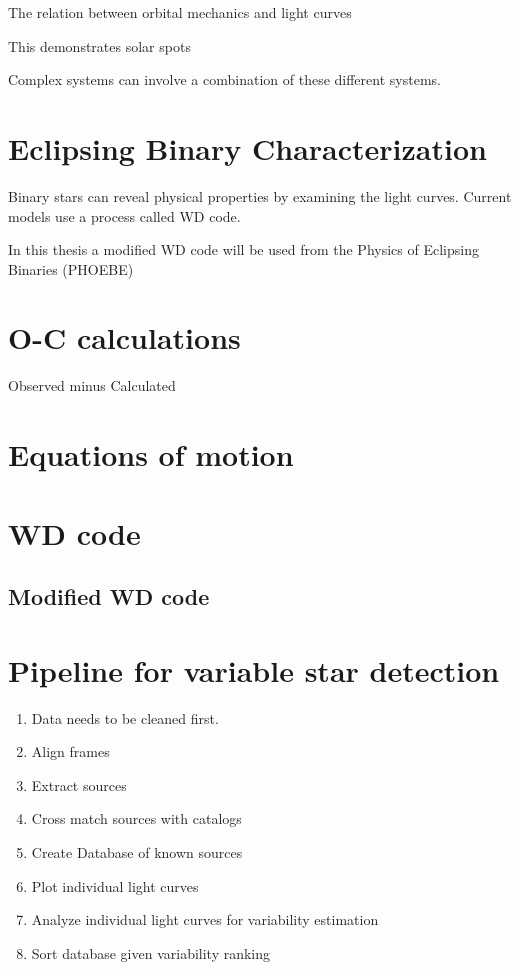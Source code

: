 The relation between orbital mechanics and light curves

This demonstrates solar spots

Complex systems can involve a combination of these different systems.

\section{Eclipsing Binary Characterization}
Binary stars can reveal physical properties by examining the light curves.
Current models use a process called WD code.

In this thesis a modified WD code will be used from the Physics of Eclipsing Binaries (PHOEBE)

\section{O-C calculations}
Observed minus Calculated

\section{Equations of motion}

\section{WD code}
\subsection{Modified WD code}

\section{Pipeline for variable star detection}
\begin{enumerate}
    \item Data needs to be cleaned first.
    \item Align frames
    \item Extract sources
    \item Cross match sources with catalogs
    \item Create Database of known sources
    \item Plot individual light curves
    \item Analyze individual light curves for variability estimation
    \item Sort database given variability ranking
\end{enumerate}




